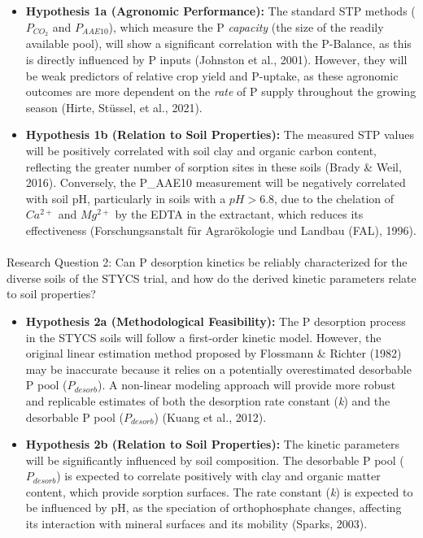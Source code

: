 \documentclass[
  a4paper,
]{article}
\makeatletter
\let\oldparagraph\paragraph
\renewcommand{\paragraph}{
    \@ifstar
      \xxxParagraphStar
      \xxxParagraphNoStar
  }
\newcommand{\xxxParagraphStar}[1]{\oldparagraph*{#1}\mbox{}}
\newcommand{\xxxParagraphNoStar}[1]{\oldparagraph{#1}\mbox{}}
\makeatother
\begin{document}
\begin{itemize}
\item
  \textbf{Hypothesis 1a (Agronomic Performance):} The standard STP
  methods (\(P_{CO_2}\) and \(P_{AAE10}\)), which measure the P
  \emph{capacity} (the size of the readily available pool), will show a
  significant correlation with the P-Balance, as this is directly
  influenced by P inputs (Johnston et al., 2001). However, they will be
  weak predictors of relative crop yield and P-uptake, as these
  agronomic outcomes are more dependent on the \emph{rate} of P supply
  throughout the growing season (Hirte, Stüssel, et al., 2021).
\item
  \textbf{Hypothesis 1b (Relation to Soil Properties):} The measured STP
  values will be positively correlated with soil clay and organic carbon
  content, reflecting the greater number of sorption sites in these
  soils (Brady \& Weil, 2016). Conversely, the P\_AAE10 measurement will
  be negatively correlated with soil pH, particularly in soils with a
  \(pH > 6.8\), due to the chelation of \(Ca^{2+}\) and \(Mg^{2+}\) by
  the EDTA in the extractant, which reduces its effectiveness
  (Forschungsanstalt für Agrarökologie und Landbau (FAL), 1996).
\end{itemize}

\paragraph{Research Question 2: Can P desorption kinetics be reliably
characterized for the diverse soils of the STYCS trial, and how do the
derived kinetic parameters relate to soil
properties?}\label{research-question-2-can-p-desorption-kinetics-be-reliably-characterized-for-the-diverse-soils-of-the-stycs-trial-and-how-do-the-derived-kinetic-parameters-relate-to-soil-properties}

\begin{itemize}
\item
  \textbf{Hypothesis 2a (Methodological Feasibility):} The P desorption
  process in the STYCS soils will follow a first-order kinetic model.
  However, the original linear estimation method proposed by Flossmann
  \& Richter (1982) may be inaccurate because it relies on a potentially
  overestimated desorbable P pool (\(P_{desorb}\)). A non-linear
  modeling approach will provide more robust and replicable estimates of
  both the desorption rate constant (\emph{k}) and the desorbable P pool
  (\(P_{desorb}\)) (Kuang et al., 2012).
\item
  \textbf{Hypothesis 2b (Relation to Soil Properties):} The kinetic
  parameters will be significantly influenced by soil composition. The
  desorbable P pool (\(P_{desorb}\)) is expected to correlate positively
  with clay and organic matter content, which provide sorption surfaces.
  The rate constant (\emph{k}) is expected to be influenced by pH, as
  the speciation of orthophosphate changes, affecting its interaction
  with mineral surfaces and its mobility (Sparks, 2003).
\end{itemize}
\end{document}
